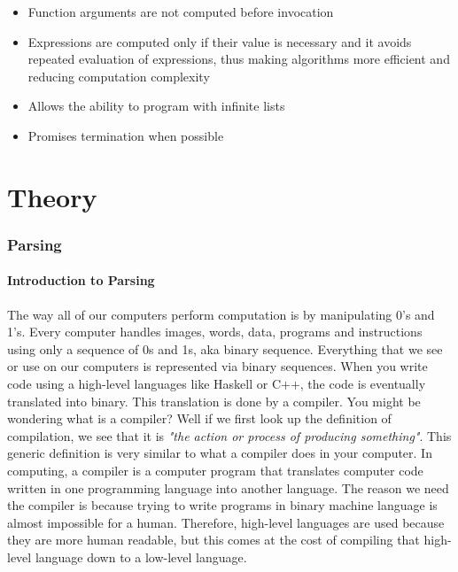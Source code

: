 \documentclass{article}
\begin{document}
\begin{itemize}
    \item Function arguments are not computed before invocation
    \item Expressions are computed only if their value is necessary and it avoids repeated evaluation of expressions, thus making algorithms more efficient and reducing computation complexity
    \item Allows the ability to program with infinite lists
    \item Promises termination when possible  

\end{itemize}

\part{Theory}

\section{Parsing}
\subsection{Introduction to Parsing}
The way all of our computers perform computation is by manipulating 0's and 1's. Every computer handles images, words, data, programs and instructions using only a sequence of 0s and 1s, aka binary sequence. Everything that we see or use on our computers is represented via binary sequences. When you write code using a high-level languages like Haskell or C++, the code is eventually translated into binary. This translation is done by a compiler. You might be wondering what is a compiler? Well if we first look up the definition of compilation, we see that it is \textit{"the action or process of producing something"}. This generic definition is very similar to what a compiler does in your computer. In computing, a compiler is a computer program that translates computer code written in one programming language into another language. The reason we need the compiler is because trying to write programs in binary machine language is almost impossible for a human. Therefore, high-level languages are used because they are more human readable, but this comes at the cost of compiling that high-level language down to a low-level language.
\end{document}
